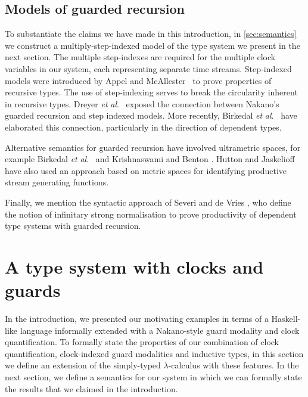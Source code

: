 \documentclass[natbib]{sigplanconf}
\newcommand{\etal}{\textit{et} \textit{al}.}
\begin{document}
\subsection{Models of guarded recursion}

To substantiate the claims we have made in this introduction, in
\autoref{sec:semantics} we construct a multiply-step-indexed model of
the type system we present in the next section. The multiple
step-indexes are required for the multiple clock variables in our
system, each representing separate time streams. Step-indexed models
were introduced by Appel and McAllester~\cite{appel01indexed} to prove
properties of recursive types. The use of step-indexing serves to
break the circularity inherent in recursive types. Dreyer
\etal~\cite{dreyer11logical} exposed the connection between Nakano's
guarded recursion and step indexed models. More recently, Birkedal
\etal~\cite{birkedal12first,birkedal13intensional} have elaborated
this connection, particularly in the direction of dependent types.

Alternative semantics for guarded recursion have involved ultrametric
spaces, for example Birkedal \etal~\cite{birkedal10metric} and
Krishnaswami and Benton \cite{krishnaswami11ultrametric}. Hutton and
Jaskelioff \cite{hutton11representing} have also used an approach
based on metric spaces for identifying productive stream generating
functions.

Finally, we mention the syntactic approach of Severi and de Vries
\cite{severi12pure}, who define the notion of infinitary strong
normalisation to prove productivity of dependent type systems with
guarded recursion.

\section{A type system with clocks and guards}
\label{sec:type-system}

In the introduction, we presented our motivating examples in terms of
a Haskell-like language informally extended with a Nakano-style guard
modality and clock quantification. To formally state the properties of
our combination of clock quantification, clock-indexed guard
modalities and inductive types, in this section we define an extension
of the simply-typed $\lambda$-calculus with these features. In the
next section, we define a semantics for our system in which we can
formally state the results that we claimed in the introduction.
\end{document}
